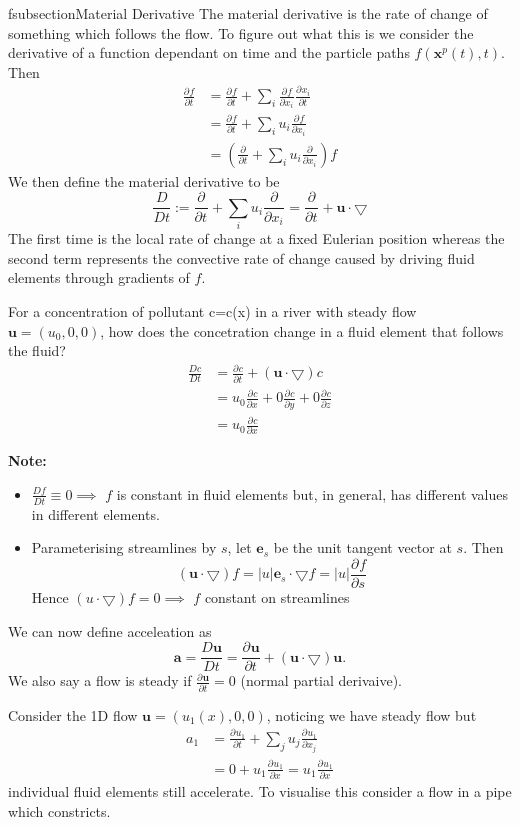 \documentclass[11pt]{article}
\newcommand*{\pd}[3][]{\ensuremath{\frac{\partial^{#1} {#2}}{\partial {#3}^{#1}}}}
\newcommand*{\md}[1]{\ensuremath{\frac{D #1}{D t}}}
\newcommand{\grad}{\bigtriangledown}
\newcommand{\defeq}{:=}
\newcommand{\mv}[1]{\textbf{#1}}
\newcommand{\mdf}[1]{{\color{red}#1}}
\newenvironment{eg}
    {\begin{mdframed}[backgroundcolor=mylg, roundcorner=5pt, linewidth=0pt]}
    {\end{mdframed}}
\newenvironment{note}
    {\textbf{Note:}\begin{mdframed}[backgroundcolor=white, roundcorner=5pt, linewidth=0pt]}
    {\end{mdframed}}
\begin{document}
fsubsection{Material Derivative}
The \mdf{material derivative} is the rate of change of something which follows the flow. To figure out what this is we consider the derivative of a function dependant on time and the particle paths $f(\mv{x}^p(t),t)$. Then
\begin{align*}
    \pd{f}{t}&=\pd{f}{t}+\sum_i \pd{f}{x_i}\pd{x_i}{t}\\
             &=\pd{f}{t}+\sum_i u_i\pd{f}{x_i}\\
             &=\left(\pd{ }{t} + \sum_i u_i\pd{ }{x_i}\right)f
\end{align*}
We then define the \mdf{material derivative} to be
$$\md{ }\defeq \pd{ }{t}+\sum_i u_i\pd{ }{x_i}=\pd{ }{t}+\mv{u}\cdot\grad$$
The first time is the local rate of change at a fixed Eulerian position whereas the second term represents the convective rate of change caused by driving fluid elements through gradients of $f$.
\begin{eg}
For a concentration of pollutant c=c(x) in a river with steady flow $\mv{u}=(u_0,0,0)$, how does the concetration change in a fluid element that follows the fluid?
\begin{align*}
    \md{c}&=\pd{c}{t}+(\mv{u}\cdot\grad)c\\
          &=u_0\pd{c}{x}+0\pd{c}{y}+0\pd{c}{z}\\
          &=u_0\pd{c}{x}
\end{align*}
\end{eg}
\begin{note}
\begin{itemize}
    \item $\md{f}\equiv 0 \implies$ $f$ is constant in fluid elements but, in general, has different values in different elements.
    \item Parameterising streamlines by $s$, let $\mv{e}_s$ be the unit tangent vector at $s$. Then
    $$(\mv{u}\cdot\grad) f= |u|\mv{e}_s\cdot\grad f=|u|\pd{f}{s}$$
    Hence $(u\cdot\grad)f = 0\implies$ $f$ constant on streamlines
\end{itemize}
\end{note}
We can now define \mdf{acceleation} as
$$\mv{a}=\md{\mv{u}}=\pd{\mv{u}}{t}+(\mv{u}\cdot\grad)\mv{u}.$$
We also say a flow is \mdf{steady} if $\pd{\mv{u}}{t}=0$ (normal partial derivaive).
\begin{eg}
Consider the 1D flow $\mv{u}=(u_1(x),0,0)$, noticing we have steady flow but
\begin{align*}
    a_1&=\pd{u_1}{t}+\sum_j u_j\pd{u_1}{x_j}\\
       &= 0 + u_1 \pd{u_1}{x} = u_1 \pd{u_1}{x}
\end{align*}
individual fluid elements still accelerate. To visualise this consider a flow in a pipe which constricts.
\end{eg}
\end{document}
